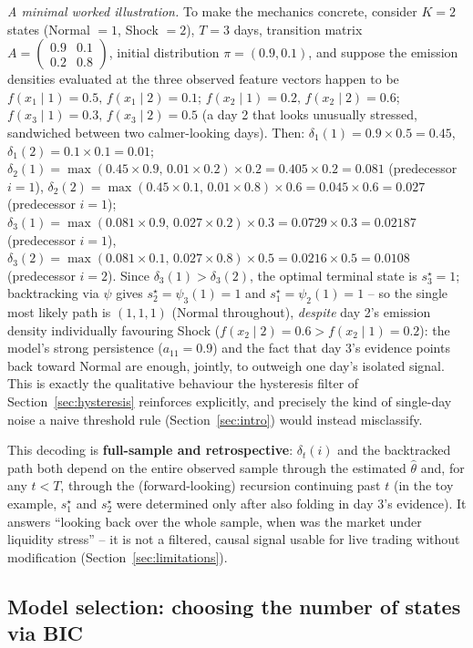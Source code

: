 \documentclass[11pt]{article}
\theoremstyle{definition}
\theoremstyle{remark}
\begin{document}
\emph{A minimal worked illustration.} To make the mechanics concrete, consider $K=2$ states (Normal $=1$, Shock $=2$), $T=3$ days, transition matrix $A=\left(\begin{smallmatrix}0.9&0.1\\0.2&0.8\end{smallmatrix}\right)$, initial distribution $\pi=(0.9,0.1)$, and suppose the emission densities evaluated at the three observed feature vectors happen to be $f(x_1\mid 1)=0.5,\,f(x_1\mid2)=0.1$; $f(x_2\mid1)=0.2,\,f(x_2\mid2)=0.6$; $f(x_3\mid1)=0.3,\,f(x_3\mid2)=0.5$ (a day 2 that looks unusually stressed, sandwiched between two calmer-looking days). Then: $\delta_1(1)=0.9\times0.5=0.45$, $\delta_1(2)=0.1\times0.1=0.01$; $\delta_2(1)=\max(0.45\times0.9,\,0.01\times0.2)\times0.2=0.405\times0.2=0.081$ (predecessor $i=1$), $\delta_2(2)=\max(0.45\times0.1,\,0.01\times0.8)\times0.6=0.045\times0.6=0.027$ (predecessor $i=1$); $\delta_3(1)=\max(0.081\times0.9,\,0.027\times0.2)\times0.3=0.0729\times0.3=0.02187$ (predecessor $i=1$), $\delta_3(2)=\max(0.081\times0.1,\,0.027\times0.8)\times0.5=0.0216\times0.5=0.0108$ (predecessor $i=2$). Since $\delta_3(1)>\delta_3(2)$, the optimal terminal state is $s_3^\star=1$; backtracking via $\psi$ gives $s_2^\star=\psi_3(1)=1$ and $s_1^\star=\psi_2(1)=1$ -- so the single most likely path is $(1,1,1)$ (Normal throughout), \emph{despite} day 2's emission density individually favouring Shock ($f(x_2\mid2)=0.6>f(x_2\mid1)=0.2$): the model's strong persistence ($a_{11}=0.9$) and the fact that day 3's evidence points back toward Normal are enough, jointly, to outweigh one day's isolated signal. This is exactly the qualitative behaviour the hysteresis filter of Section~\ref{sec:hysteresis} reinforces explicitly, and precisely the kind of single-day noise a naive threshold rule (Section~\ref{sec:intro}) would instead misclassify.

This decoding is \textbf{full-sample and retrospective}: $\delta_t(i)$ and the backtracked path both depend on the entire observed sample through the estimated $\widehat\theta$ and, for any $t<T$, through the (forward-looking) recursion continuing past $t$ (in the toy example, $s_1^\star$ and $s_2^\star$ were determined only after also folding in day 3's evidence). It answers ``looking back over the whole sample, when was the market under liquidity stress'' -- it is not a filtered, causal signal usable for live trading without modification (Section~\ref{sec:limitations}).

\subsection{Model selection: choosing the number of states via BIC}
\label{sec:bic}
\end{document}
